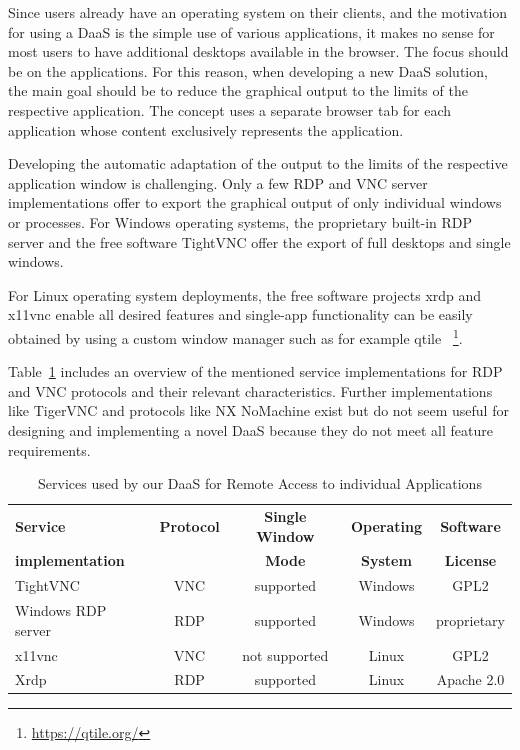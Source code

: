 \documentclass[runningheads]{llncs}
\begin{document}
Since users already have an operating system on their clients,
and the motivation for using a DaaS is the simple use of various applications,
it makes no sense for most users to have additional desktops available in the browser.
The focus should be on the applications.
For this reason, when developing a new DaaS solution,
the main goal should be to reduce the graphical output
to the limits of the respective application.
The concept uses a separate browser tab for each application
whose content exclusively represents the application.

Developing the automatic adaptation of the output
to the limits of the respective application window is challenging.
Only a few RDP and VNC server implementations offer to export the graphical output
of only individual windows or processes.
For Windows operating systems, the proprietary built-in RDP server
and the free software TightVNC offer the export of full desktops and single windows.

For Linux operating system deployments,
the free software projects xrdp and x11vnc enable all desired features
and single-app functionality can be easily obtained
by using a custom window manager such as for example qtile
~\footnote{\url{https://qtile.org/}}.

Table~\ref{tab:DaaS_Services_Overview} includes an overview
of the mentioned service implementations for RDP and VNC protocols
and their relevant characteristics.
Further implementations like TigerVNC and protocols like NX NoMachine exist
but do not seem useful for designing and implementing a novel DaaS because
they do not meet all feature requirements.~\cite{OJCC_2023v8i1n01_Baun}

\begin{table}
	\centering
	\caption{Services used by our DaaS for Remote Access to individual Applications}
	\begin{tabular}{|l|c|c|c|c|}
		\hline
		\textbf{Service}        & \textbf{Protocol} & \textbf{Single Window} & \textbf{Operating} & \textbf{Software} \\
		\textbf{implementation} &                   & \textbf{Mode}          & \textbf{System}    & \textbf{License}  \\
		\hline
		TightVNC                & VNC               & supported              & Windows            & GPL2              \\
		\hline
		Windows RDP server      & RDP               & supported              & Windows            & proprietary       \\
		\hline
		x11vnc                  & VNC               & not supported          & Linux              & GPL2              \\
		\hline
		Xrdp                    & RDP               & supported              & Linux              & Apache 2.0        \\
		\hline
	\end{tabular}
	\label{tab:DaaS_Services_Overview}
\end{table}
\end{document}
